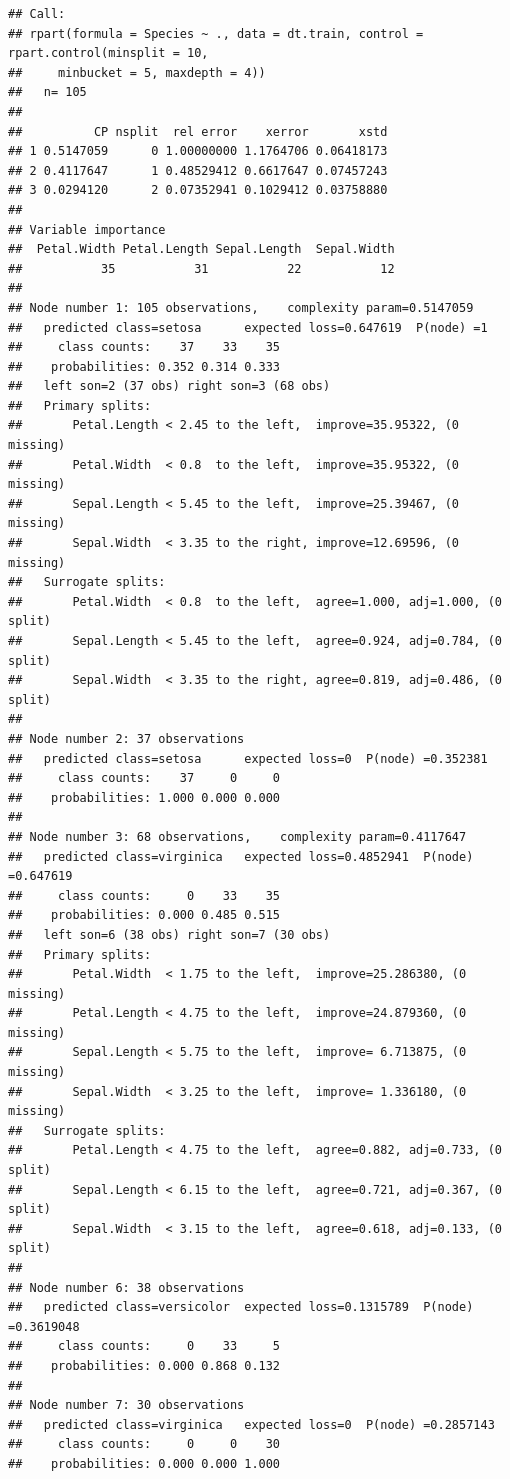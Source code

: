 \documentclass[]{book}
\theoremstyle{plain}
\theoremstyle{definition}
\theoremstyle{definition}
\theoremstyle{definition}
\theoremstyle{definition}
\theoremstyle{remark}
\begin{document}
\begin{verbatim}
## Call:
## rpart(formula = Species ~ ., data = dt.train, control = rpart.control(minsplit = 10, 
##     minbucket = 5, maxdepth = 4))
##   n= 105 
## 
##          CP nsplit  rel error    xerror       xstd
## 1 0.5147059      0 1.00000000 1.1764706 0.06418173
## 2 0.4117647      1 0.48529412 0.6617647 0.07457243
## 3 0.0294120      2 0.07352941 0.1029412 0.03758880
## 
## Variable importance
##  Petal.Width Petal.Length Sepal.Length  Sepal.Width 
##           35           31           22           12 
## 
## Node number 1: 105 observations,    complexity param=0.5147059
##   predicted class=setosa      expected loss=0.647619  P(node) =1
##     class counts:    37    33    35
##    probabilities: 0.352 0.314 0.333 
##   left son=2 (37 obs) right son=3 (68 obs)
##   Primary splits:
##       Petal.Length < 2.45 to the left,  improve=35.95322, (0 missing)
##       Petal.Width  < 0.8  to the left,  improve=35.95322, (0 missing)
##       Sepal.Length < 5.45 to the left,  improve=25.39467, (0 missing)
##       Sepal.Width  < 3.35 to the right, improve=12.69596, (0 missing)
##   Surrogate splits:
##       Petal.Width  < 0.8  to the left,  agree=1.000, adj=1.000, (0 split)
##       Sepal.Length < 5.45 to the left,  agree=0.924, adj=0.784, (0 split)
##       Sepal.Width  < 3.35 to the right, agree=0.819, adj=0.486, (0 split)
## 
## Node number 2: 37 observations
##   predicted class=setosa      expected loss=0  P(node) =0.352381
##     class counts:    37     0     0
##    probabilities: 1.000 0.000 0.000 
## 
## Node number 3: 68 observations,    complexity param=0.4117647
##   predicted class=virginica   expected loss=0.4852941  P(node) =0.647619
##     class counts:     0    33    35
##    probabilities: 0.000 0.485 0.515 
##   left son=6 (38 obs) right son=7 (30 obs)
##   Primary splits:
##       Petal.Width  < 1.75 to the left,  improve=25.286380, (0 missing)
##       Petal.Length < 4.75 to the left,  improve=24.879360, (0 missing)
##       Sepal.Length < 5.75 to the left,  improve= 6.713875, (0 missing)
##       Sepal.Width  < 3.25 to the left,  improve= 1.336180, (0 missing)
##   Surrogate splits:
##       Petal.Length < 4.75 to the left,  agree=0.882, adj=0.733, (0 split)
##       Sepal.Length < 6.15 to the left,  agree=0.721, adj=0.367, (0 split)
##       Sepal.Width  < 3.15 to the left,  agree=0.618, adj=0.133, (0 split)
## 
## Node number 6: 38 observations
##   predicted class=versicolor  expected loss=0.1315789  P(node) =0.3619048
##     class counts:     0    33     5
##    probabilities: 0.000 0.868 0.132 
## 
## Node number 7: 30 observations
##   predicted class=virginica   expected loss=0  P(node) =0.2857143
##     class counts:     0     0    30
##    probabilities: 0.000 0.000 1.000
\end{verbatim}
\end{document}
